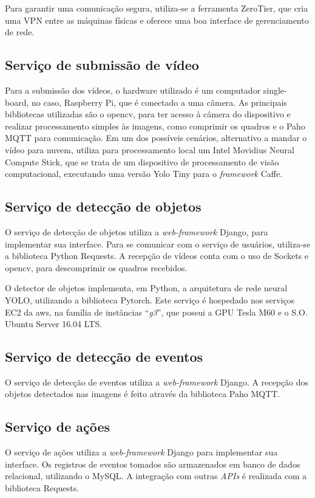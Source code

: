 \documentclass[]{politex}
\begin{document}
Para garantir uma comunicação segura, utiliza-se a ferramenta ZeroTier, que cria uma VPN entre as máquinas físicas e oferece uma boa interface de gerenciamento de rede.

\subsection{Serviço de submissão de vídeo}
Para a submissão dos vídeos, o hardware utilizado é um computador single-board, no caso, Raspberry Pi, que é conectado a uma câmera. As principais bibliotecas utilizadas são o \acrshort{opencv}, para ter acesso à câmera do dispositivo e realizar processamento simples às imagens, como comprimir os quadros e o Paho MQTT para comunicação. Em um dos possíveis cenários, alternativo a mandar o vídeo para nuvem, utiliza para processamento local um Intel Movidius Neural Compute Stick, que se trata de um dispositivo de processamento de visão computacional, executando uma versão Yolo Tiny para o \textit{framework} Caffe.

\subsection{Serviço de detecção de objetos}
O serviço de detecção de objetos utiliza a \textit{web-framework} Django, para implementar sua interface. Para se comunicar com o serviço de usuários, utiliza-se a biblioteca Python Requests. A recepção de vídeos conta com o uso de Sockets e \acrshort{opencv}, para descomprimir os quadros recebidos.

O detector de objetos implementa, em Python, a arquitetura de rede neural YOLO, utilizando a biblioteca Pytorch. Este serviço é hospedado nos serviços EC2 da \acrshort{aws}, na família de instâncias “\textit{g3}”, que possui a GPU Tesla M60 e o S.O. Ubuntu Server 16.04 LTS.

\subsection{Serviço de detecção de eventos}
O serviço de detecção de eventos utiliza a \textit{web-framework} Django. A recepção dos objetos detectados nas imagens é feito através da biblioteca Paho MQTT.

\subsection{Serviço de ações}
O serviço de ações utiliza a \textit{web-framework} Django para implementar sua interface. Os registros de eventos tomados são armazenados em banco de dados relacional, utilizando o MySQL. A integração com outras \textit{APIs} é realizada com a biblioteca Requests.
\end{document}
